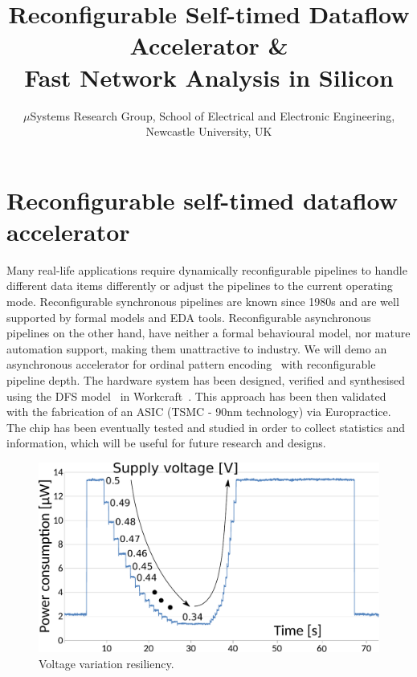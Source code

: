 \documentclass[conference]{IEEEtran}
\begin{document}
\title{Reconfigurable Self-timed Dataflow Accelerator \&\\Fast Network Analysis in Silicon}

\author{$\mu$Systems Research Group, School of Electrical and Electronic Engineering, Newcastle University, UK}

\maketitle


\IEEEpeerreviewmaketitle

\section*{Reconfigurable self-timed dataflow accelerator}
Many real-life applications require dynamically
reconfigurable pipelines to handle different data items differently or adjust
the pipelines to the current operating mode. Reconfigurable synchronous
pipelines are known since 1980s and are well
supported by formal models and EDA tools. Reconfigurable asynchronous
pipelines on the other hand, have neither a formal behavioural model, nor
mature automation support, making them unattractive to industry.
We will demo an asynchronous accelerator for ordinal pattern encoding~\cite{OPE} with
reconfigurable pipeline depth. The hardware system has been designed, verified and synthesised
using the DFS model~\cite{DFS} in Workcraft~\cite{workcraft_web}. This approach has been
then validated with the fabrication of an ASIC (TSMC - 90nm technology) via
Europractice. The chip has been eventually tested and studied in order to collect statistics
and information, which will be useful for future research and designs.

\begin{figure}[ht!]
\vspace{-3mm}
\begin{center}
	\includegraphics[width=\linewidth]{FIG/voltage-var.pdf}
	\caption{Voltage variation resiliency.}
	\label{fig:voltage-var}
\end{center}
\vspace{-5mm}
\end{figure}
\end{document}
